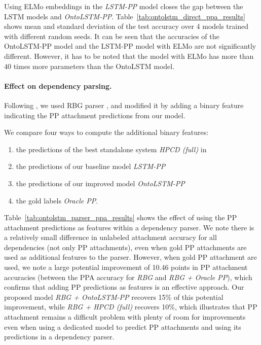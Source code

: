 Using ELMo embeddings in the \textit{LSTM-PP} model closes the gap between the
LSTM models and \textit{OntoLSTM-PP}. Table~\ref{tab:ontolstm_direct_ppa_results} shows
mean and standard deviation of the test accuracy over 4 models trained with different random
seeds. It can be seen that the accuracies of the OntoLSTM-PP model and the LSTM-PP model
with ELMo are not significantly different.
However, it has to be noted that the model with ELMo has more than $40$ times more
parameters than the OntoLSTM model.

\paragraph{Effect on dependency parsing.} Following
\cite{belinkov2014exploring}, we used RBG parser \citep{lei2014low}, and
modified it by adding a binary feature indicating the PP attachment predictions
from our model. 

We compare four ways to compute the additional binary features:
\begin{enumerate} \item the predictions of the best standalone system
		\textit{HPCD (full)} in \cite{belinkov2014exploring} \item the
			predictions of our baseline model \textit{LSTM-PP} \item
the predictions of our improved model \textit{OntoLSTM-PP} \item the gold labels
\textit{Oracle PP}.  \end{enumerate}

Table~\ref{tab:ontolstm_parser_ppa_results} shows the effect of using the PP
attachment predictions as features within a dependency parser.  We note there is
a relatively small difference in unlabeled attachment accuracy for all
dependencies (not only PP attachments), even when gold PP attachments are used
as additional features to the parser.  However, when gold PP attachment are
used, we note a large potential improvement of 10.46 points in PP attachment
accuracies (between the PPA accuracy for \textit{RBG} and \textit{RBG + Oracle
PP}), which confirms that adding PP predictions as features is an effective
approach.  Our proposed model \textit{RBG + OntoLSTM-PP} recovers 15\% of this
potential improvement, while \textit{RBG + HPCD (full)} recovers 10\%, which
illustrates that PP attachment remains a difficult problem with plenty of room
for improvements even when using a dedicated model to predict PP attachments and
using its predictions in a dependency parser.

